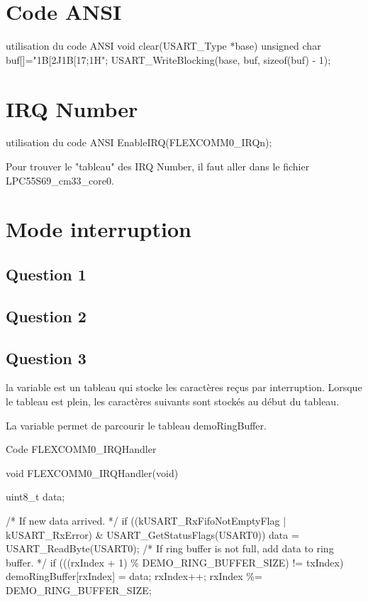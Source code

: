 
\section{Code ANSI}



\begin{Cpp}{utilisation du code ANSI} 
void clear(USART_Type *base)
{
	unsigned char buf[]="\x1B[2J\x1B[17;1H";
	USART_WriteBlocking(base, buf, sizeof(buf) - 1);
}
\end{Cpp}

\section{IRQ Number}

\begin{Cpp}{utilisation du code ANSI} 
EnableIRQ(FLEXCOMM0_IRQn);
\end{Cpp}

Pour trouver le "tableau" des IRQ Number, il faut aller dans le fichier LPC55S69\_cm33\_core0.


\section{Mode interruption}

\subsection{Question 1}

\subsection{Question 2}


\subsection{Question 3}



la variable  est un tableau qui stocke les caractères reçus par interruption.
Lorsque le tableau est plein, les caractères suivants sont stockés au début du tableau.

La variable  permet de parcourir le tableau demoRingBuffer. 

\begin{Cpp}{Code FLEXCOMM0\_IRQHandler}

void FLEXCOMM0_IRQHandler(void) {
    uint8_t data;

    /* If new data arrived. */
    if ((kUSART_RxFifoNotEmptyFlag | kUSART_RxError) & USART_GetStatusFlags(USART0)) {
        data = USART_ReadByte(USART0);
        /* If ring buffer is not full, add data to ring buffer. */
        if (((rxIndex + 1) \% DEMO_RING_BUFFER_SIZE) != txIndex) {
            demoRingBuffer[rxIndex] = data;
            rxIndex++;
            rxIndex \%= DEMO_RING_BUFFER_SIZE;
        }
    }

}
\end{Cpp}



